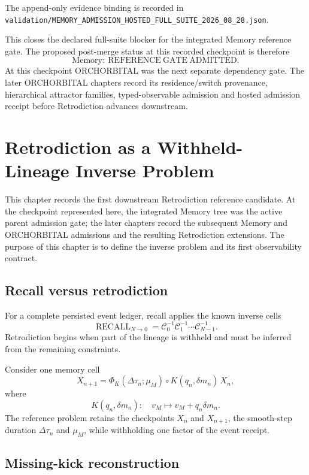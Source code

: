 \documentclass[11pt]{book}
\begin{document}
The append-only evidence binding is recorded in
\texttt{validation/MEMORY\_ADMISSION\_HOSTED\_FULL\_SUITE\_2026\_08\_28.json}.

This closes the declared full-suite blocker for the integrated Memory reference gate. The proposed post-merge status at this recorded checkpoint is therefore
\[
\boxed{\mathrm{Memory}:\ \mathrm{REFERENCE\ GATE\ ADMITTED}.}
\]
At this checkpoint ORCHORBITAL was the next separate dependency gate. The later ORCHORBITAL chapters record its residence/switch provenance, hierarchical attractor families, typed-observable admission and hosted admission receipt before Retrodiction advances downstream.

\chapter{Retrodiction as a Withheld-Lineage Inverse Problem}

This chapter records the first downstream Retrodiction reference candidate. At the checkpoint represented here, the integrated Memory tree was the active parent admission gate; the later chapters record the subsequent Memory and ORCHORBITAL admissions and the resulting Retrodiction extensions. The purpose of this chapter is to define the inverse problem and its first observability contract.

\section{Recall versus retrodiction}

For a complete persisted event ledger, recall applies the known inverse cells
\[
\operatorname{RECALL}_{N\to0}
=\mathcal C_0^{-1}\mathcal C_1^{-1}\cdots\mathcal C_{N-1}^{-1}.
\]
Retrodiction begins when part of the lineage is withheld and must be inferred from the remaining constraints.

Consider one memory cell
\[
X_{n+1}
=\Phi_K(\Delta\tau_n;\mu_M)
\circ K(q_n,\delta m_n)
\,X_n,
\]
where
\[
K(q_n,\delta m_n):
\quad v_M\mapsto v_M+q_n\delta m_n.
\]
The reference problem retains the checkpoints \(X_n\) and \(X_{n+1}\), the smooth-step duration \(\Delta\tau_n\) and \(\mu_M\), while withholding one factor of the event receipt.

\section{Missing-kick reconstruction}
\end{document}
